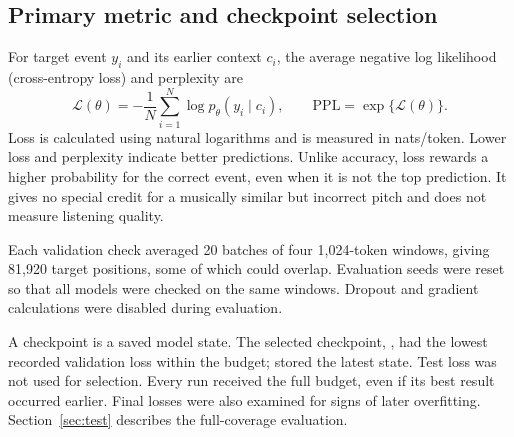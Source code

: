 \subsection*{Primary metric and checkpoint selection}
For target event $y_i$ and its earlier context $c_i$, the average negative log likelihood (cross-entropy loss) and perplexity are
\begin{equation}
\mathcal L(\theta)=-\frac{1}{N}\sum_{i=1}^{N}\log p_\theta(y_i\mid c_i),
\qquad \mathrm{PPL}=\exp\{\mathcal L(\theta)\}.
\label{eq:nll}
\end{equation}
Loss is calculated using natural logarithms and is measured in nats/token. Lower loss and perplexity indicate better predictions. Unlike accuracy, loss rewards a higher probability for the correct event, even when it is not the top prediction. It gives no special credit for a musically similar but incorrect pitch and does not measure listening quality.

Each validation check averaged 20 batches of four 1,024-token windows, giving 81,920 target positions, some of which could overlap. Evaluation seeds were reset so that all models were checked on the same windows. Dropout and gradient calculations were disabled during evaluation.

A checkpoint is a saved model state. The selected checkpoint, , had the lowest recorded validation loss within the budget;  stored the latest state. Test loss was not used for selection. Every run received the full budget, even if its best result occurred earlier. Final losses were also examined for signs of later overfitting. Section~\ref{sec:test} describes the full-coverage evaluation.
